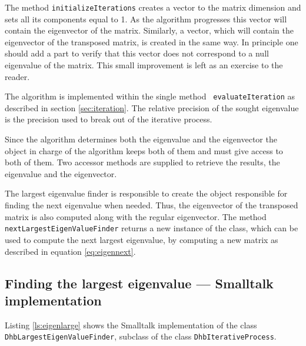 \documentclass[twoside]{book}
\begin{document}
The method {\tt initializeIterations} creates a vector to the
matrix dimension and sets all its components equal to 1. As the
algorithm progresses this vector will contain the eigenvector of
the matrix. Similarly, a vector, which will contain the
eigenvector of the transposed matrix, is created in the same way.
In principle one should add a part to verify that this vector does
not correspond to a null eigenvalue of the matrix. This small
improvement is left as an exercise to the reader.

The algorithm is implemented within the single method {\tt
evaluateIteration} as described in section \ref{sec:iteration}.
The relative precision of the sought eigenvalue is the precision
used to break out of the iterative process.

Since the algorithm determines both the eigenvalue and the
eigenvector the object in charge of the algorithm keeps both of
them and must give access to both of them. Two accessor methods
are supplied to retrieve the results, the eigenvalue and the
eigenvector.

The largest eigenvalue finder is responsible to create the object
responsible for finding the next eigenvalue when needed. Thus, the
eigenvector of the transposed matrix is also computed along with
the regular eigenvector. The method {\tt
nextLargestEigenValueFinder} returns a new instance of the class,
which can be used to compute the next largest eigenvalue, by
computing a new matrix as described in equation
\ref{eq:eigennext}.

\subsection{Finding the largest eigenvalue --- Smalltalk
implementation} Listing \ref{ls:eigenlarge} shows the Smalltalk
implementation of the  class {\tt DhbLargestEigenValueFinder},
subclass of the class {\tt DhbIterativeProcess}.
\end{document}
